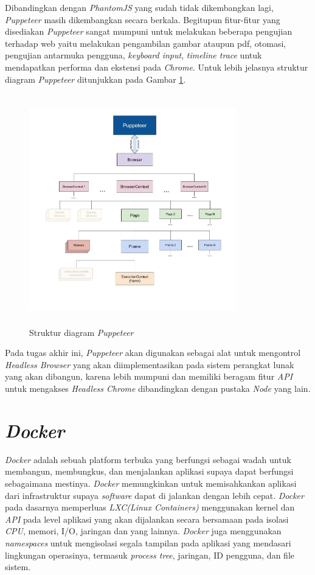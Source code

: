 		\indent Dibandingkan dengan \textit{PhantomJS} yang sudah tidak dikembangkan lagi, \textit{Puppeteer} masih dikembangkan secara berkala. Begitupun fitur-fitur yang disediakan \textit{Puppeteer} sangat mumpuni untuk melakukan beberapa pengujian terhadap web yaitu melakukan pengambilan gambar ataupun pdf, otomasi, pengujian antarmuka pengguna, \textit{keyboard input}, \textit{timeline trace} untuk mendapatkan performa dan ekstensi pada \textit{Chrome}. Untuk lebih jelasnya struktur diagram \textit{Puppeteer} ditunjukkan pada Gambar \ref{puppeteeroverview}.
			\begin{figure}[H]
				\centering
				\includegraphics[width=9cm,height=10cm]{Images/C-2/puppeteeroverview.jpg}
				\caption{Struktur diagram \textit{Puppeteer}}
				\label{puppeteeroverview}
			\end{figure}
			
		\indent Pada tugas akhir ini, \textit{Puppeteer} akan digunakan sebagai alat untuk mengontrol \textit{Headless Browser} yang akan diimplementasikan pada sistem perangkat lunak yang akan dibangun, karena lebih mumpuni dan memiliki beragam fitur \textit{API} untuk mengakses \textit{Headless Chrome} dibandingkan dengan pustaka \textit{Node} yang lain.
		
	\section{\textit{Docker}}
		\textit{Docker} adalah sebuah platform terbuka yang berfungsi sebagai wadah untuk membangun, membungkus, dan menjalankan aplikasi supaya dapat berfungsi sebagaimana mestinya. \textit{Docker} memungkinkan untuk memisahkankan aplikasi dari infrastruktur supaya \textit{software} dapat di jalankan dengan lebih cepat. \textit{Docker} pada dasarnya memperluas \textit{LXC(Linux Containers)} menggunakan kernel dan \textit{API} pada level aplikasi yang akan dijalankan secara bersamaan pada isolasi \textit{CPU}, memori, I/O, jaringan dan yang lainnya. \textit{Docker} juga menggunakan \textit{namespaces} untuk mengisolasi segala tampilan pada aplikasi yang mendasari lingkungan operasinya, termasuk \textit{process tree}, jaringan, ID pengguna, dan file sistem. 
		
